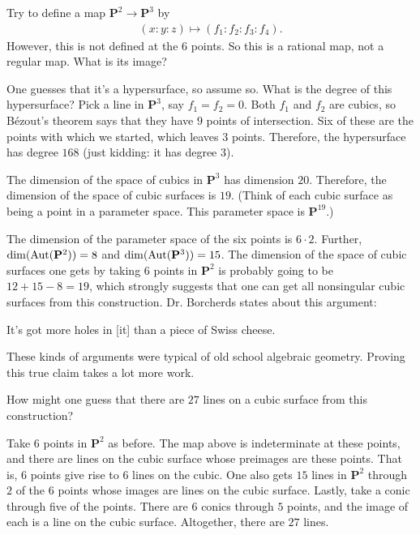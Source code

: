 \documentclass [11 pt, oneside, margin = 1 in] {article}
\begin{document}
Try to define a map $\mathbf{P}^2 \longrightarrow \mathbf{P}^3$ by 
\begin{align*}
	(x:y:z)\longmapsto  (f_1:f_2:f_3:f_4).
\end{align*}
However, this is not defined at the $6$ points. So this is a rational map, not a regular map. What is its image?

One guesses that it's a hypersurface, so assume so. What is the degree of this hypersurface? Pick a line in $\mathbf{P}^3$, say $f_1=f_2=0$. Both $f_1$ and $f_2$ are cubics, so B\'ezout's theorem says that they have $9$ points of intersection. Six of these are the points with which we started, which leaves $3$ points. Therefore, the hypersurface has degree $168$ (just kidding: it has degree $3$).

The dimension of the space of cubics in $\mathbf{P}^3$ has dimension $20$. Therefore, the dimension of the space of cubic surfaces is $19$.  (Think of each cubic surface as being a point in a parameter space. This parameter space is $\mathbf{P}^{19}$.) 

The dimension of the parameter space of the six points is $6\cdot 2$. Further, $\dim (\operatorname{Aut}(\mathbf{P}^2))=8$ and $\dim(\operatorname{Aut}(\mathbf{P}^3)) =15$. The dimension of the space of cubic surfaces one gets by taking $6$ points in $\mathbf{P}^2$ is probably going to be $12+15-8=19$, which strongly suggests that one can get all nonsingular cubic surfaces from this construction. Dr. Borcherds states about this argument:
\begin{center}
	\small It's got more holes in [it] than a piece of Swiss cheese.
\end{center}

These kinds of arguments were typical of old school algebraic geometry. Proving this true claim takes a lot more work.

\begin{problem}
	How might one guess that there are $27$ lines on a cubic surface from this construction?
\end{problem}

Take $6$ points in $\mathbf{P}^2$ as before. The map above is indeterminate at these points, and there are lines on the cubic surface whose preimages are these points. That is, $6$ points give rise to $6$ lines on the cubic. One also gets $15$ lines in $\mathbf{P}^2$ through $2$ of the $6$ points whose images are lines on the cubic surface. Lastly, take a conic through five of the points. There are $6$ conics through $5$ points, and the image of each is a line on the cubic surface. Altogether, there are $27$ lines.
\end{document}
